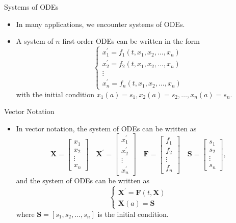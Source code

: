 \documentclass{beamer}
\begin{document}
\begin{frame}{Systems of ODEs}
    \begin{itemize}
        \item In many applications, we encounter systems of ODEs.
        \item A system of $n$ first-order ODEs can be written in the form
        \[
        \left\{\begin{array}{l}
            x_1^{\prime}=f_1(t, x_1, x_2, \ldots, x_n) \\
            x_2^{\prime}=f_2(t, x_1, x_2, \ldots, x_n) \\
            \vdots \\
            x_n^{\prime}=f_n(t, x_1, x_2, \ldots, x_n)
            \end{array}\right.
            \]
   with the initial condition $x_1(a)=s_1, x_2(a)=s_2, \ldots, x_n(a)=s_n$.
    \end{itemize}
\end{frame}
\begin{frame}{Vector Notation}
    \begin{itemize}
    \item 
   
    In vector notation, the system of ODEs can be written as
    $$
    \mathbf{X}=\left[\begin{array}{c}
    x_1 \\
    x_2 \\
    \vdots \\
    x_n
    \end{array}\right] \quad \mathbf{X}^{\prime}=\left[\begin{array}{c}
    x_1^{\prime} \\
    x_2^{\prime} \\
    \vdots \\
    x_n^{\prime}
    \end{array}\right] \quad \mathbf{F}=\left[\begin{array}{c}
    f_1 \\
    f_2 \\
    \vdots \\
    f_n
    \end{array}\right] \quad \mathbf{S}=\left[\begin{array}{c}
    s_1 \\
    s_2 \\
    \vdots \\
    s_n
    \end{array}\right], 
    $$
    and the system of ODEs can be written as
    $$
    \left\{\begin{array}{l}
        \mathbf{X}^{\prime}=\mathbf{F}(t, \mathbf{X}) \\
        \mathbf{X}(a)=\mathbf{S} 
        \end{array}\right.
        $$
        where $\mathbf{S}=[s_1, s_2, \ldots, s_n]$ is the initial condition.
    \end{itemize}
\end{frame}
\end{document}
